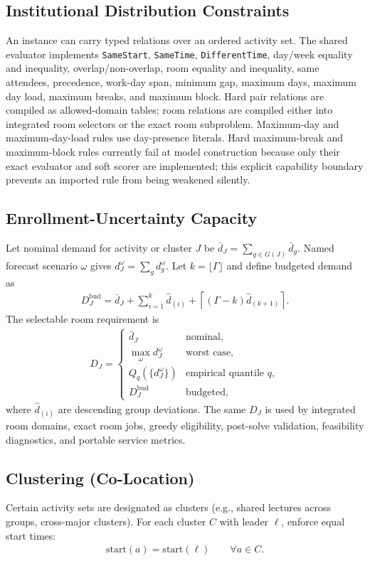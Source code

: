 \subsection{Institutional Distribution Constraints}
An instance can carry typed relations over an ordered activity set.
The shared evaluator implements \texttt{SameStart}, \texttt{SameTime}, \texttt{DifferentTime}, day/week equality and inequality, overlap/non-overlap, room equality and inequality, same attendees, precedence, work-day span, minimum gap, maximum days, maximum day load, maximum breaks, and maximum block.
Hard pair relations are compiled as allowed-domain tables; room relations are compiled either into integrated room selectors or the exact room subproblem.
Maximum-day and maximum-day-load rules use day-presence literals.
Hard maximum-break and maximum-block rules currently fail at model construction because only their exact evaluator and soft scorer are implemented; this explicit capability boundary prevents an imported rule from being weakened silently.

\subsection{Enrollment-Uncertainty Capacity}
Let nominal demand for activity or cluster $J$ be $\bar d_J=\sum_{g\in G(J)}\bar d_g$.
Named forecast scenario $\omega$ gives $d_J^\omega=\sum_g d_g^\omega$.
Let $k=\lfloor\Gamma\rfloor$ and define budgeted demand as
\begin{align}
D_J^{\mathrm{bud}}
=\bar d_J+\sum_{i=1}^{k}\hat d_{(i)}
+\left\lceil(\Gamma-k)\hat d_{(k+1)}\right\rceil .
\end{align}
The selectable room requirement is
\begin{align}
D_J = \begin{cases}
\bar d_J & \text{nominal},\\
\max_\omega d_J^\omega & \text{worst case},\\
Q_q(\{d_J^\omega\}) & \text{empirical quantile }q,\\
D_J^{\mathrm{bud}} & \text{budgeted},
\end{cases}
\end{align}
where $\hat d_{(i)}$ are descending group deviations.
The same $D_J$ is used by integrated room domains, exact room jobs, greedy eligibility, post-solve validation, feasibility diagnostics, and portable service metrics.

\subsection{Clustering (Co-Location)}
Certain activity sets are designated as clusters (e.g., shared lectures across groups, cross-major clusters).
For each cluster $C$ with leader $\ell$, enforce equal start times:
\begin{align}
\mathrm{start}(a) = \mathrm{start}(\ell) \qquad \forall a\in C.
\end{align}


